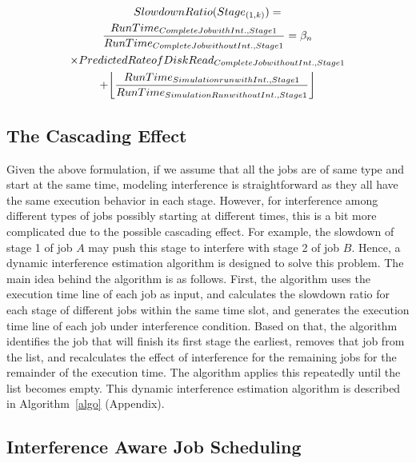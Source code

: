 \begin{equation}
\label{slowdisk}
\begin{gathered}
SlowdownRatio(Stage_{(1,k)})=\\
\frac{RunTime_{Complete Job with Int., Stage 1}}{RunTime_{Complete Job without Int., Stage 1}} = \beta_{n} \\
\times PredictedRateofDiskRead_{Complete Job without Int., Stage 1} \\ + \floor*{\frac{Run Time_{Simulation run with Int., Stage 1}}{Run Time_{Simulation Run without Int., Stage 1}}}
\end{gathered}
\end{equation}



\subsection{The Cascading Effect}
Given the above formulation, if we assume that all the jobs are of same type and start at the same time, modeling interference is straightforward as they all have the same execution behavior in each stage. However, for interference among different types of jobs possibly starting at different times, this is a bit more complicated due to the possible cascading effect. For example, the slowdown of stage 1 of job $A$ may push this stage to interfere with stage 2 of job $B$. Hence, a dynamic interference estimation algorithm is designed to solve this problem. The main idea behind the algorithm is as follows. First, the algorithm uses the execution time line of each job as input, and calculates the slowdown ratio for each stage of different jobs within the same time slot, and generates the execution time line of each job under interference condition. Based on that, the algorithm identifies the job that will finish its first stage the earliest, removes that job from the list, and recalculates the effect of interference for the remaining jobs for the remainder of the execution time. The algorithm applies this repeatedly until the list becomes empty. This dynamic interference estimation algorithm is described in Algorithm~\ref{algo} (Appendix).





\subsection{Interference Aware Job Scheduling}
\label{scheduler}

